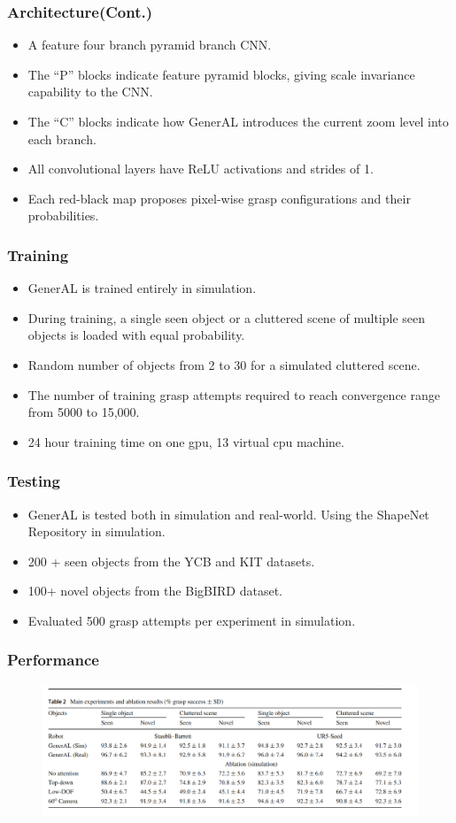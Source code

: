 \documentclass{beamer}
\begin{document}
\begin{frame}\frametitle{Architecture(Cont.)}
\begin{itemize}
    \item A feature four branch pyramid branch CNN.
    \item The “P” blocks indicate feature pyramid blocks, giving scale invariance capability to the CNN.
    \item The “C” blocks indicate how GenerAL introduces the current zoom level into each branch.
    \item All convolutional layers have ReLU activations and strides of 1.
    \item Each red-black map proposes pixel-wise grasp configurations and their probabilities.
\end{itemize}
\end{frame}


\begin{frame}\frametitle{Training}
\begin{itemize}
    \item GenerAL is trained entirely in simulation.
    \item During training, a single seen object or a cluttered scene of multiple seen objects is loaded with equal probability.
    \item Random number of objects from 2 to 30 for a simulated cluttered scene.
    \item The number of training grasp attempts required to reach convergence range from 5000 to 15,000.
    \item 24 hour training time on one gpu, 13 virtual cpu machine.
\end{itemize}
\end{frame}

\begin{frame}\frametitle{Testing}
\begin{itemize}
\item GenerAL is tested both in simulation and real-world. Using the ShapeNet Repository in simulation.
\item 200 + seen objects from the YCB and KIT datasets.
\item 100+ novel objects from the BigBIRD dataset.
\item Evaluated 500 grasp attempts per experiment in simulation.
\end{itemize}
\end{frame}

\begin{frame}\frametitle{Performance}
\begin{figure}
\includegraphics[width=0.8\linewidth]{results}
\end{figure}
\end{frame}
\end{document}

